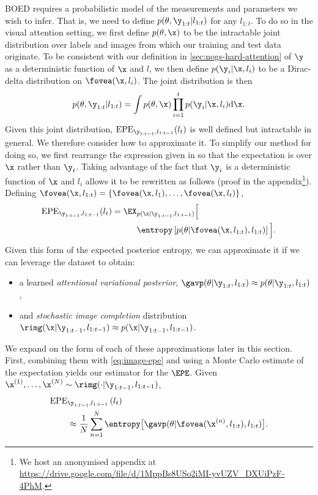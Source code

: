 BOED requires a probabilistic model of the measurements and parameters we wish
to infer. That is, we need to define $p(\theta, \y_{1:t} | l_{1:t})$ for any
$l_{1:t}$. To do so in the visual attention setting, we first define $p(\theta,
\x)$ to be the intractable joint distribution over labels and images from which
our training and test data originate. %
%
To be consistent with our definition in \cref{sec:nogs-hard-attention} of $\y$ as a
deterministic function of $\x$ and $l$, we then define $p(\y_i|\x,l_i)$ to be a
Dirac-delta distribution on $\fovea(\x,l_i)$.
%
The joint distribution is then
\begin{equation} \label{eq:p-joint}
  p(\theta, \y_{1:t}|l_{1:t}) = \int p(\theta, \x) \prod_{i=1}^t p(\y_i|\x,l_i) \mathrm{d}\x.
\end{equation}
Given this joint distribution, $\text{EPE}_{\y_{1:t-1}, l_{1:t-1}} (l_t)$ is
well defined but intractable in general. We therefore consider how to
approximate it. To simplify our method for doing so, we first rearrange the
expression given in  so that the expectation is over $\x$
rather than $\y_t$. Taking advantage of the fact that $\y_i$ is a deterministic
function of $\x$ and $l_i$ allows it to be rewritten as follows (proof in the
appendix\footnote{We host an anonymised appendix at
  \url{https://drive.google.com/file/d/1MppBs8USo2iMI-yvUZV_DXUiPzF-4PhM}.}).
Defining $\fovea(\x, l_{1:t}) = \{ \fovea(\x, l_{1}),\ldots,\fovea(\x, l_t) \}$,
\begin{align} \label{eq:image-epe}
  \text{EPE}_{\y_{1:t-1}, l_{1:t-1}} (l_t) = \EX&_{p(\x | \y_{1:t-1}, l_{1:t-1})} \Big[ \nonumber\\
                                                &\entropy \left[ p(\theta | \fovea(\x, l_{1:t}), l_{1:t} ) \right]  \Big].
\end{align}
Given this form of the expected posterior entropy, we can approximate it if we
can leverage the dataset to obtain:
\begin{itemize}[itemsep=0pt, topsep=0pt]
\item a learned \textit{attentional variational posterior}, $\gavp(\theta | \y_{1:t}, l_{1:t} )
  \approx p(\theta | \y_{1:t}, l_{1:t} )$,
\item and \textit{stochastic image completion} distribution
  $\rimg(\x|\y_{1:t-1},l_{1:t-1}) \approx p(\x|\y_{1:t-1},l_{1:t-1})$.
\end{itemize}
We expand on the form of each of these approximations later in this section.
First, combining them with \cref{eq:image-epe} and using a Monte Carlo estimate
of the expectation yields our estimator for the $\EPE$. Given $\x^{(1)},\ldots,\x^{(N)} \sim \rimg(\cdot|\y_{1:t-1},l_{1:t-1})$,
\begin{align} \label{eq:approx-epe}
  \text{EPE}&_{\y_{1:t-1}, l_{1:t-1}} \left( l_{t} \right) \nonumber\\ &\approx \frac{1}{N} \sum_{n=1}^N \entropy \big[ \gavp(\theta | \fovea(\x^{(n)}, l_{1:t}), l_{1:t} ) \big] .
\end{align}

